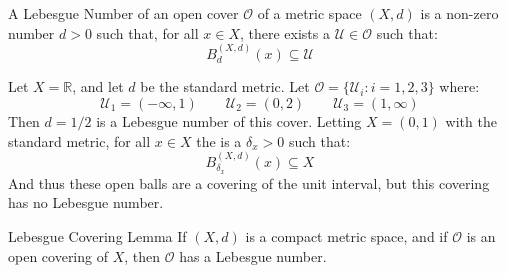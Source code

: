 \documentclass[crop=false,class=article,oneside]{standalone}
\begin{document}
            \begin{ldefinition}
                A Lebesgue Number of an open cover
                $\mathcal{O}$ of a metric space $(X,d)$ is a non-zero
                number $d>0$ such that, for all $x\in{X}$, there exists
                a $\mathcal{U}\in\mathcal{O}$ such that:
                \begin{equation}
                    B_{d}^{(X,d)}(x)\subseteq\mathcal{U}
                \end{equation}
            \end{ldefinition}
            \begin{lexample}
                Let $X=\mathbb{R}$, and let $d$ be the standard metric.
                Let $\mathcal{O}=\{\mathcal{U}_{i}:i=1,2,3\}$ where:
                \begin{equation}
                    \mathcal{U}_{1}=(-\infty,1)
                    \quad\quad
                    \mathcal{U}_{2}=(0,2)
                    \quad\quad
                    \mathcal{U}_{3}=(1,\infty)
                \end{equation}
                Then $d=1/2$ is a Lebesgue number of this cover.
                Letting $X=(0,1)$ with the standard metric, for all
                $x\in{X}$ the is a $\delta_{x}>0$ such that:
                \begin{equation}
                    B_{\delta_{x}}^{(X,d)}(x)
                    \subseteq{X}
                \end{equation}
                And thus these open balls are a covering of the unit
                interval, but this covering has no Lebesgue number.
            \end{lexample}
            \begin{ltheorem}{Lebesgue Covering Lemma}
                If $(X,d)$ is a compact metric space, and if
                $\mathcal{O}$ is an open covering of $X$, then
                $\mathcal{O}$ has a Lebesgue number.
            \end{ltheorem}
\end{document}
